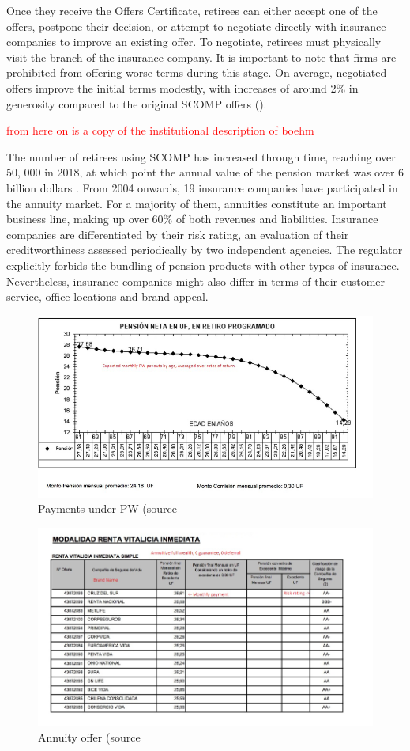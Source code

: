 \documentclass[12pt]{article}
\theoremstyle{plain}
\theoremstyle{plain}
\begin{document}
Once they receive the Offers Certificate, retirees can either accept one of the offers, postpone their decision, or attempt to negotiate directly with insurance companies to improve an existing offer. To negotiate, retirees must physically visit the branch of the insurance company. It is important to note that firms are prohibited from offering worse terms during this stage. On average, negotiated offers improve the initial terms modestly, with increases of around 2\% in generosity compared to the original SCOMP offers (\cite{illanes_retirement_2019}).

\textcolor{red}{from here on is a copy of the institutional description of boehm }

 The number of retirees using SCOMP has increased through time, reaching over 50, 000 in 2018, at which point the annual value of the pension market was over 6 billion dollars . From 2004 onwards, 19 insurance companies have participated in the annuity market. For a majority of them, annuities constitute an important business line, making up over 60\% of both revenues and liabilities. Insurance companies are differentiated by their risk rating, an evaluation of their creditworthiness assessed periodically by two independent agencies. The regulator explicitly forbids the bundling of pension products with other types of insurance. Nevertheless, insurance companies might also differ in terms of their customer service, office locations and brand appeal.


\begin{figure}
    \centering
    \includegraphics[width=0.5\linewidth]{figures/PW_flows.png}
    \caption{Payments under PW (source \textcite{illanes_retirement_2019}}
    \label{fig:offer_PW}
\end{figure}

\begin{figure}
    \centering
    \includegraphics[width=0.5\linewidth]{figures/annuity_offer.png}
    \caption{Annuity offer (source \textcite{illanes_retirement_2019}}
    \label{fig:offer_ann1}
\end{figure}
\end{document}
